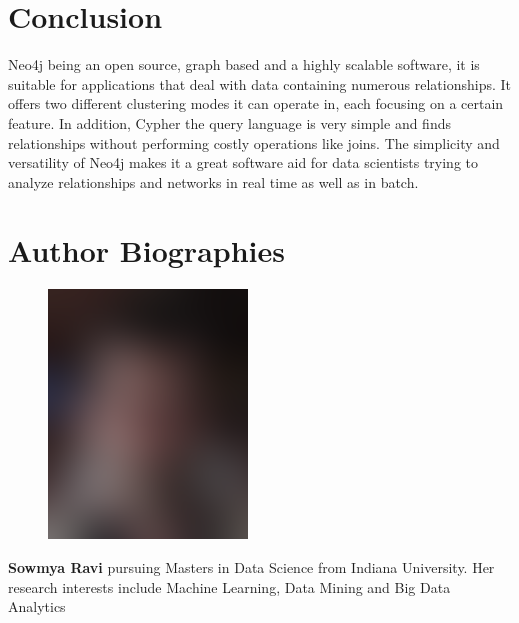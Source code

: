 \documentclass[9pt,twocolumn,twoside]{../../styles/osajnl}
\begin{document}
\section{Conclusion}
Neo4j being an open source, graph based and a highly scalable software, it is suitable for applications that deal with data containing numerous relationships. It offers two different clustering modes it can operate in, each focusing on a certain feature. In addition, Cypher the query language is very simple and finds relationships without performing costly operations like joins. The simplicity and  versatility of Neo4j makes it a great software aid for data scientists trying to analyze relationships and networks in real time as well as in batch. 



 
\section*{Author Biographies}
\begingroup
\setlength\intextsep{0pt}
\begin{minipage}[t][3.2cm][t]{1.0\columnwidth} %
  \begin{figure}
    \includegraphics[width=0.25\columnwidth]{images/john_smith.eps}
  \end{figure}
  \noindent
  {\bfseries Sowmya Ravi} pursuing Masters in Data Science from Indiana University. Her research interests include Machine Learning, Data Mining and Big Data Analytics
\end{minipage}

\endgroup

\newpage

\appendix
\end{document}
